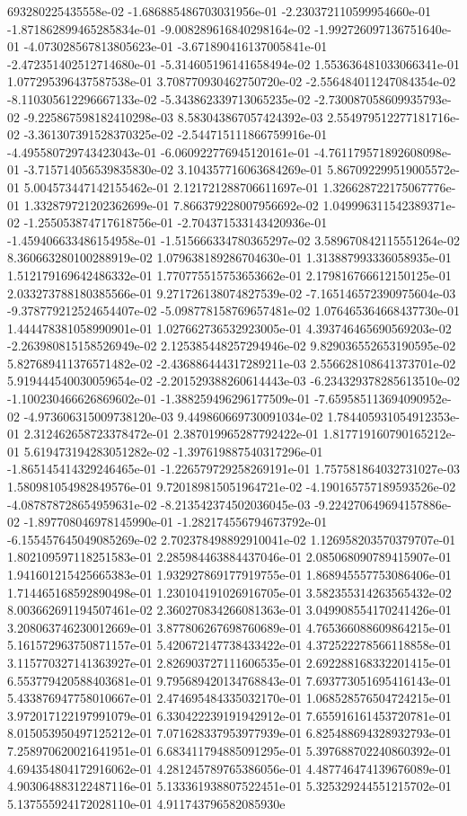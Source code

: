693280225435558e-02	-1.686885486703031956e-01	-2.230372110599954660e-01	-1.871862899465285834e-01	-9.008289616840298164e-02	-1.992726097136751640e-01	-4.073028567813805623e-01	-3.671890416137005841e-01	-2.472351402512714680e-01	-5.314605196141658494e-02	1.553636481033066341e-01	1.077295396437587538e-01	3.708770930462750720e-02	-2.556484011247084354e-02	-8.110305612296667133e-02	-5.343862339713065235e-02	-2.730087058609935793e-02	-9.225867598182410298e-03	8.583043867057424392e-03	2.554979512277181716e-02	-3.361307391528370325e-02	-2.544715111866759916e-01	-4.495580729743423043e-01	-6.060922776945120161e-01	-4.761179571892608098e-01	-3.715714056539835830e-02	3.104357716063684269e-01	5.867092299519005572e-01	5.004573447142155462e-01	2.121721288706611697e-01	1.326628722175067776e-01	1.332879721202362699e-01	7.866379228007956692e-02	1.049996311542389371e-02	-1.255053874717618756e-01	-2.704371533143420936e-01	-1.459406633486154958e-01	-1.515666334780365297e-02	3.589670842115551264e-02	8.360663280100288919e-02	1.079638189286704630e-01	1.313887993336058935e-01	1.512179169642486332e-01	1.770775515753653662e-01	2.179816766612150125e-01	2.033273788180385566e-01	9.271726138074827539e-02	-7.165146572390975604e-03	-9.378779212524654407e-02	-5.098778158769657481e-02	1.076465364668437730e-01	1.444478381058990901e-01	1.027662736532923005e-01	4.393746465690569203e-02	-2.263980815158526949e-02	2.125385448257294946e-02	9.829036552653190595e-02	5.827689411376571482e-02	-2.436886444317289211e-03	2.556628108641373701e-02	5.919444540030059654e-02	-2.201529388260614443e-03	-6.234329378285613510e-02	-1.100230466626869602e-01	-1.388259496296177509e-01	-7.659585113694090952e-02	-4.973606315009738120e-03	9.449860669730091034e-02	1.784405931054912353e-01	2.312462658723378472e-01	2.387019965287792422e-01	1.817719160790165212e-01	5.619473194283051282e-02	-1.397619887540317296e-01	-1.865145414329246465e-01	-1.226579729258269191e-01	1.757581864032731027e-03	1.580981054982849576e-01	9.720189815051964721e-02	-4.190165757189593526e-02	-4.087878728654959631e-02	-8.213542374502036045e-03	-9.224270649694157886e-02	-1.897708046978145990e-01	-1.282174556794673792e-01	-6.155457645049085269e-02	2.702378498892910041e-02	1.126958203570379707e-01	1.802109597118251583e-01	2.285984463884437046e-01	2.085068090789415907e-01	1.941601215425665383e-01	1.932927869177919755e-01	1.868945557753086406e-01	1.714465168592890498e-01	1.230104191026916705e-01	3.582355314263565432e-02	8.003662691194507461e-02	2.360270834266081363e-01	3.049908554170241426e-01	3.208063746230012669e-01	3.877806267698760689e-01	4.765366088609864215e-01	5.161572963750871157e-01	5.420672147738433422e-01	4.372522278566118858e-01	3.115770327141363927e-01	2.826903727111606535e-01	2.692288168332201415e-01	6.553779420588403681e-01	9.795689420134768843e-01	7.693773051695416143e-01	5.433876947758010667e-01	2.474695484335032170e-01	1.068528576504724215e-01	3.972017122197991079e-01	6.330422239191942912e-01	7.655916161453720781e-01	8.015053950497125212e-01	7.071628337953977939e-01	6.825488694328932793e-01	7.258970620021641951e-01	6.683411794885091295e-01	5.397688702240860392e-01	4.694354804172916062e-01	4.281245789765386056e-01	4.487746474139676089e-01	4.903064883122487116e-01	5.133361938807522451e-01	5.325329244551215702e-01	5.137555924172028110e-01	4.911743796582085930e